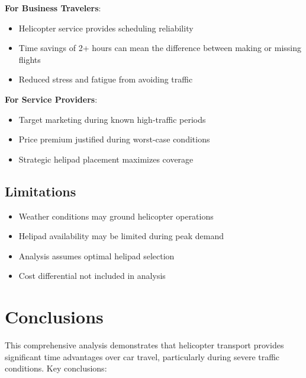 \documentclass[12pt,a4paper]{article}
\begin{document}
\textbf{For Business Travelers}:
\begin{itemize}
    \item Helicopter service provides scheduling reliability
    \item Time savings of 2+ hours can mean the difference between making or missing flights
    \item Reduced stress and fatigue from avoiding traffic
\end{itemize}

\textbf{For Service Providers}:
\begin{itemize}
    \item Target marketing during known high-traffic periods
    \item Price premium justified during worst-case conditions
    \item Strategic helipad placement maximizes coverage
\end{itemize}

\subsection{Limitations}

\begin{itemize}
    \item Weather conditions may ground helicopter operations
    \item Helipad availability may be limited during peak demand
    \item Analysis assumes optimal helipad selection
    \item Cost differential not included in analysis
\end{itemize}

\section{Conclusions}

This comprehensive analysis demonstrates that helicopter transport provides significant time advantages over car travel, particularly during severe traffic conditions. Key conclusions:
\end{document}

